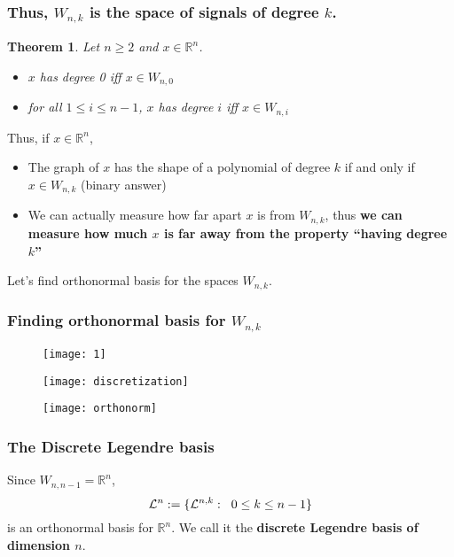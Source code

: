\documentclass[]{beamer}
\newtheorem{teo}{\bf Theorem}
\theoremstyle{definition}
\newcommand{\IR}{\mathbb{R}}
\newcommand{\cali}[1]{\mathcal{#1}} %
\begin{document}
\begin{frame}
\frametitle{Thus, $W_{n,k}$ is the space of signals of degree $k$. }

\begin{teo}
Let $n \geq 2$ and $x \in \IR^{n}$.
\begin{itemize}
\item $x$ has degree 0 iff $x \in W_{n,0}$
\item for all $1 \leq i \leq n-1$, $x$ has degree $i$ iff
$x \in W_{n,i}$
\end{itemize}
\end{teo}

Thus, if $x \in \IR^{n}$, 
\begin{itemize}
	\item The graph of $x$ has the shape of a polynomial
	of degree $k$ if and only if $x \in W_{n,k}$
	(binary answer)
	\item We can actually measure how far apart 
	$x$ is from $W_{n,k}$, thus \textbf{we can measure how much
	$x$ is far away from the property ``having degree $k$''}
\end{itemize}

Let's find orthonormal basis for the spaces $W_{n,k}$.

\end{frame}


\begin{frame}
\frametitle{Finding orthonormal basis for $W_{n,k}$}
\begin{figure}[h]
\texttt{[image: 1]}
\end{figure}
\end{frame}

\begin{frame}
\begin{figure}[h]
\texttt{[image: discretization]}
\end{figure}
\end{frame}

\begin{frame}
\begin{figure}[h]
\texttt{[image: orthonorm]}
\end{figure}
\end{frame}

\begin{frame}
\frametitle{The Discrete Legendre basis}
Since $W_{n, n-1} = \IR^{n}$, 
\[
\cali{L}^{n} := \{ \cali{L}^{n,k}: \hspace{0.2cm} 0 \leq k \leq n-1 \}
\]
is an orthonormal basis for $\IR^{n}$. We call it the
\textbf{discrete Legendre basis of dimension $n$}.
\end{frame}
\end{document}
